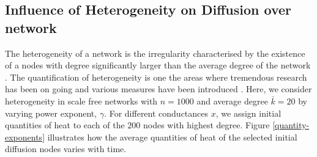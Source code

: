 \documentclass[10pt,a4paper]{article}
\theoremstyle{plain}
\theoremstyle{definition}
\begin{document}
     \subsection{Influence of Heterogeneity on Diffusion over network}
     The heterogeneity of a network is the irregularity characterised by the existence of a nodes with degree significantly larger than the average degree of the network \cite{estrada2010quantifying,albert2002statistical,newman2003structure}.
     The quantification of heterogeneity is one the areas where tremendous research has been on going and various measures have been introduced \cite{estrada2010quantifying}.
     Here, we consider heterogeneity in scale free networks with $n=1000$ and average degree $\bar{k}=20$ by varying power exponent, $\gamma$. For different conductances $x$, we assign initial quantities of heat to each of the $200$ nodes with highest degree. Figure \ref{quantity-exponents} illustrates how the average quantities of heat of the selected initial diffusion nodes varies with time.
\end{document}
